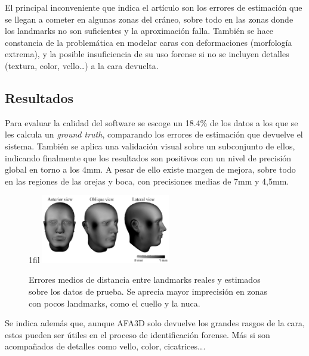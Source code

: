 \documentclass[13pt,a4paper]{article}
\makeatletter
\newcommand*{\centerfloat}{%
  \parindent \z@
  \leftskip \z@ \@plus 1fil \@minus \textwidth
  \rightskip\leftskip
  \parfillskip \z@skip}
\makeatother
\begin{document}
El principal inconveniente que indica el artículo son los errores de estimación que se llegan a cometer en algunas zonas del cráneo, sobre todo en las zonas donde los landmarks no son suficientes y la aproximación falla. También se hace constancia de la problemática en modelar caras con deformaciones (morfología extrema), y la posible insuficiencia de su uso forense si no se incluyen detalles (textura, color, vello\dots) a la cara devuelta.


\subsection{Resultados}

Para evaluar la calidad del software se escoge un 18.4\% de los datos a los que se les calcula un \textit{ground truth}, comparando los errores de estimación que devuelve el sistema.
También se aplica una validación visual sobre un subconjunto de ellos, indicando finalmente que los resultados son positivos con un nivel de precisión global en torno a los 4mm.
A pesar de ello existe margen de mejora, sobre todo en las regiones de las orejas y boca, con precisiones medias de 7mm y 4,5mm.

\begin{figure}[ht]
  \centerfloat
  \includegraphics[width=0.5\textwidth]{img/errors.png}
  \caption{Errores medios de distancia entre landmarks reales y estimados sobre los datos de prueba. Se aprecia mayor imprecisión en zonas con pocos landmarks, como el cuello y la nuca.}
\end{figure}

Se indica además que, aunque AFA3D solo devuelve los grandes rasgos de la cara, estos pueden ser útiles en el proceso de identificación forense. Más si son acompañados de detalles como vello, color, cicatrices\dots.
\end{document}
